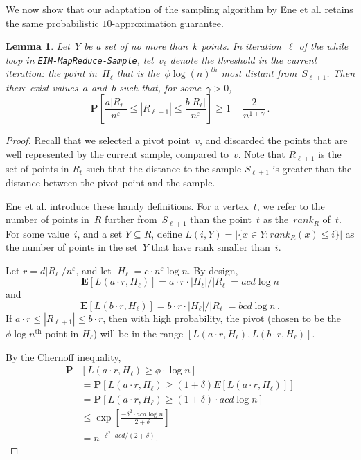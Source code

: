 \documentclass[11pt]{article}
\newtheorem{lemma}[theorem]{Lemma}
\newcommand{\eps}{\ensuremath{\varepsilon}}
\begin{document}
We now show that our adaptation of the sampling algorithm by Ene et al. retains the same probabilistic $10$-approximation guarantee.


\begin{lemma}
\label{chernoff}
Let~$Y$ be a set of no more than~$k$ points.
In iteration~$\ell$ of the while loop in
\sloppy\texttt{EIM{-}MapReduce}\texttt{{-}Sample},
let~$v_\ell$ denote the threshold in the current iteration:
the  point in~$H_\ell$ that is the~$\phi\log(n)^{th}$ most distant
from~$S_{\ell+1}$.
Then there exist values~$a$ and~$b$ such that, for some~$\gamma > 0$,
$$\mathbf{P}\left[\frac{a|R_\ell|}{n^{\eps}}\leq |R_{\ell+1}|
\leq\frac{b|R_\ell|}{n^{\eps}}\right]\geq 1-\frac{2}{n^{1+\gamma}}\,.$$
\end{lemma}

\begin{proof}
\label{chernoff-proof}
Recall that we selected a pivot point~$v$, and discarded the points that are well represented by the current sample, compared to~$v$. 
Note that $R_{\ell+1}$ is the set of points in $R_\ell$ such that the distance to the sample $S_{\ell+1}$ is greater than the distance between the pivot point and the sample.

Ene et al. introduce these handy definitions.
For a vertex~$t$, we refer to the number of points in~$R$ further
from~$S_{\ell+1}$ than the point~$t$ as the~$\mathit{rank}_R$
of~$t$. 
For some value~$i$, and a set $Y\subseteq R$,
define $L(i,Y)=\big\vert{\{x\in Y : \mathit{rank}_R(x) \leq i\}}\big\vert$
as the number of points in the set~$Y$ that have rank smaller than~$i$. 


\noindent
Let $r={d|R_\ell|}/{n^{\eps}}$, and let $|H_\ell| = c\cdot n^{\eps}\log n$.  
By design,
$$\mathbf{E}[ L(a\cdot r, H_\ell)] = {a\cdot
r\cdot|H_\ell|}/{|R_\ell|} = acd \log n$$
and $$\mathbf{E}[ L(b\cdot r, H_\ell)] = {b\cdot
r\cdot|H_\ell|}/{|R_\ell|} =  bcd \log n\,.$$
If $a\cdot r\leq |R_{\ell+1}| \leq b\cdot r$, then with high probability, the pivot
(chosen to be the  $\phi\log n^{\text{th}}$ point in $H_{\ell}$) will be in the range $[L(a\cdot r,H_{\ell}), L(b\cdot r,H_{\ell})]$.


\noindent
By the Chernoff inequality, 
\begin{align*}
 \mathbf{P}&[L(a\cdot r, H_\ell)\geq \phi\cdot\log n] \\
&= \mathbf{P}[L(a\cdot r, H_\ell)\geq(1+\delta)E[L(a\cdot r, H_\ell)]] \\
&= \mathbf{P}[L(a\cdot r, H_\ell)\geq(1+\delta)\cdot a c d\log n]  \\
&\leq \exp\left[\frac{-\delta^2\cdot a c d\log n}{2+\delta}\right] \\
&= n^{-{\delta^2\cdot acd}/(2+\delta)}.\end{align*}
\vspace{-2mm}
 

\end{proof}
\end{document}
